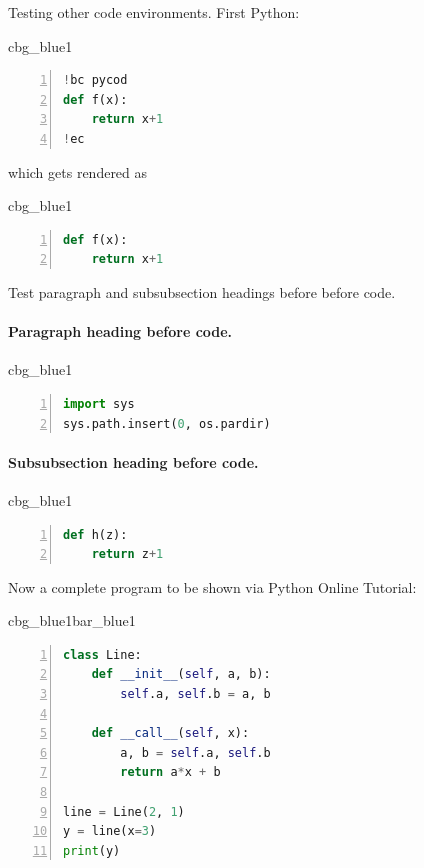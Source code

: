 \documentclass[%
oneside,                 %
final,                   %
10pt]{article}
\newenvironment{_cod_tight}[1]{
   \def\FrameCommand{\colorbox{#1}}
   \FrameRule0.6pt\MakeFramed {\FrameRestore}\vskip3mm}
   {\vskip0mm\endMakeFramed}
\newenvironment{cod}[1]{
\bgroup\rmfamily
\fboxsep=0mm\relax
\begin{_cod_tight}{#1}
\list{}{\parsep=-2mm\parskip=0mm\topsep=0pt\leftmargin=2mm
\rightmargin=2\leftmargin\leftmargin=4pt\relax}
\item\relax}
{\endlist\end{_cod_tight}\egroup}
\newenvironment{_pro_tight}[2]{
   \def\FrameCommand{\color{#2}\vrule width 1mm\normalcolor\colorbox{#1}}
   \FrameRule0.6pt\MakeFramed {\advance\hsize-2mm\FrameRestore}\vskip3mm}
   {\vskip0mm\endMakeFramed}
\newenvironment{pro}[2]{
\bgroup\rmfamily
\fboxsep=0mm\relax
\begin{_pro_tight}{#1}{#2}
\list{}{\parsep=-2mm\parskip=0mm\topsep=0pt\leftmargin=2mm
\rightmargin=2\leftmargin\leftmargin=4pt\relax}
\item\relax}
{\endlist\end{_pro_tight}\egroup}
\theoremstyle{definition}
\begin{document}
Testing other code environments. First Python:
\begin{cod}{cbg_blue1}\begin{lstlisting}[language=Python,style=myspeciallststyle,numbers=left,numberstyle=\tiny,stepnumber=3,numbersep=15pt,xleftmargin=1mm]
!bc pycod
def f(x):
    return x+1
!ec

\end{lstlisting}\end{cod}
\noindent

which gets rendered as
\begin{cod}{cbg_blue1}\begin{lstlisting}[language=Python,style=myspeciallststyle,numbers=left,numberstyle=\tiny,stepnumber=3,numbersep=15pt,xleftmargin=1mm]
def f(x):
    return x+1

\end{lstlisting}\end{cod}
\noindent

Test paragraph and subsubsection headings before
before code.
\paragraph{Paragraph heading before code.}
\begin{cod}{cbg_blue1}\begin{lstlisting}[language=Python,style=myspeciallststyle,numbers=left,numberstyle=\tiny,stepnumber=3,numbersep=15pt,xleftmargin=1mm]
import sys
sys.path.insert(0, os.pardir)

\end{lstlisting}\end{cod}
\noindent

\paragraph{Subsubsection heading before code.}
\begin{cod}{cbg_blue1}\begin{lstlisting}[language=Python,style=myspeciallststyle,numbers=left,numberstyle=\tiny,stepnumber=3,numbersep=15pt,xleftmargin=1mm]
def h(z):
    return z+1

\end{lstlisting}\end{cod}
\noindent

Now a complete program to be shown via Python Online Tutorial:
\begin{pro}{cbg_blue1}{bar_blue1}\begin{lstlisting}[language=Python,style=myspeciallststyle,numbers=left,numberstyle=\tiny,stepnumber=3,numbersep=15pt,xleftmargin=1mm]
class Line:
    def __init__(self, a, b):
        self.a, self.b = a, b

    def __call__(self, x):
        a, b = self.a, self.b
        return a*x + b

line = Line(2, 1)
y = line(x=3)
print(y)

\end{lstlisting}\end{pro}
\noindent
\end{document}
